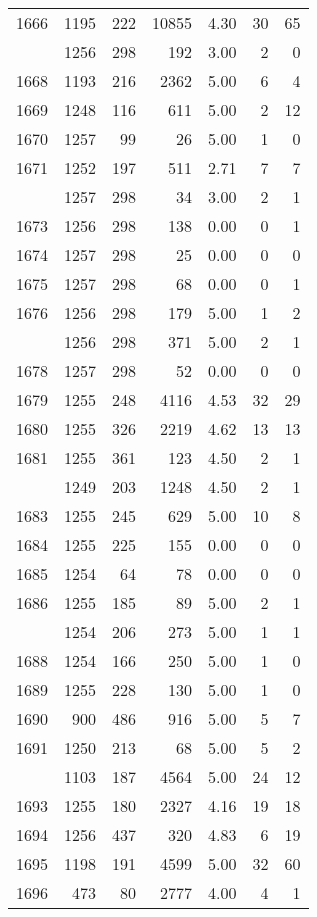 \documentclass[
]{article}
\begin{document}
\begin{table}
\begin{tabular}[t]{lrrrrrr}
1666 & 1195 & 222 & 10855 & 4.30 & 30 & 65\\
\addlinespace
1667 & 1256 & 298 & 192 & 3.00 & 2 & 0\\
1668 & 1193 & 216 & 2362 & 5.00 & 6 & 4\\
1669 & 1248 & 116 & 611 & 5.00 & 2 & 12\\
1670 & 1257 & 99 & 26 & 5.00 & 1 & 0\\
1671 & 1252 & 197 & 511 & 2.71 & 7 & 7\\
\addlinespace
1672 & 1257 & 298 & 34 & 3.00 & 2 & 1\\
1673 & 1256 & 298 & 138 & 0.00 & 0 & 1\\
1674 & 1257 & 298 & 25 & 0.00 & 0 & 0\\
1675 & 1257 & 298 & 68 & 0.00 & 0 & 1\\
1676 & 1256 & 298 & 179 & 5.00 & 1 & 2\\
\addlinespace
1677 & 1256 & 298 & 371 & 5.00 & 2 & 1\\
1678 & 1257 & 298 & 52 & 0.00 & 0 & 0\\
1679 & 1255 & 248 & 4116 & 4.53 & 32 & 29\\
1680 & 1255 & 326 & 2219 & 4.62 & 13 & 13\\
1681 & 1255 & 361 & 123 & 4.50 & 2 & 1\\
\addlinespace
1682 & 1249 & 203 & 1248 & 4.50 & 2 & 1\\
1683 & 1255 & 245 & 629 & 5.00 & 10 & 8\\
1684 & 1255 & 225 & 155 & 0.00 & 0 & 0\\
1685 & 1254 & 64 & 78 & 0.00 & 0 & 0\\
1686 & 1255 & 185 & 89 & 5.00 & 2 & 1\\
\addlinespace
1687 & 1254 & 206 & 273 & 5.00 & 1 & 1\\
1688 & 1254 & 166 & 250 & 5.00 & 1 & 0\\
1689 & 1255 & 228 & 130 & 5.00 & 1 & 0\\
1690 & 900 & 486 & 916 & 5.00 & 5 & 7\\
1691 & 1250 & 213 & 68 & 5.00 & 5 & 2\\
\addlinespace
1692 & 1103 & 187 & 4564 & 5.00 & 24 & 12\\
1693 & 1255 & 180 & 2327 & 4.16 & 19 & 18\\
1694 & 1256 & 437 & 320 & 4.83 & 6 & 19\\
1695 & 1198 & 191 & 4599 & 5.00 & 32 & 60\\
1696 & 473 & 80 & 2777 & 4.00 & 4 & 1\\

\end{tabular}
\end{table}
\end{document}
